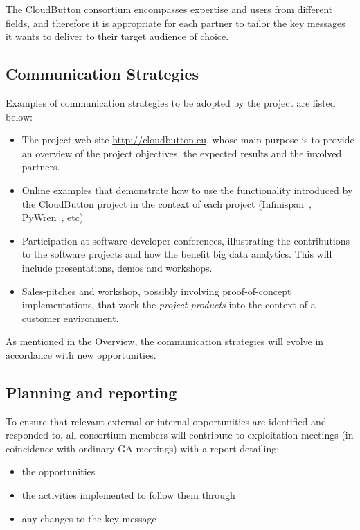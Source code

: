 \documentclass[a4paper,11pt]{article}
\begin{document}
The CloudButton consortium encompasses expertise and users from different fields, and therefore it is appropriate for each partner to tailor the key messages it wants to deliver to their target audience of choice.

\subsection{Communication Strategies}

Examples of communication strategies to be adopted by the project are listed below:

\begin{itemize}
\item The project web site \url{http://cloudbutton.eu}, whose main purpose is to provide an overview of the project objectives, the expected results and the involved partners.
\item Online examples that demonstrate how to use the functionality introduced by the CloudButton project in the context of each project (Infinispan~\cite{infinispan}, PyWren~\cite{PyWren2017}, etc)
\item Participation at software developer conferences, illustrating the contributions to the software projects and how the benefit big data analytics. This will include presentations, demos and workshops.
\item Sales-pitches and workshop, possibly involving proof-of-concept implementations, that work the \textit{project products} into the context of a customer environment.
\end{itemize}

As mentioned in the Overview, the communication strategies will evolve in accordance with new opportunities.

\subsection{Planning and reporting}

To ensure that relevant external or internal opportunities are identified and responded to, all consortium members will contribute to exploitation meetings (in coincidence with ordinary GA meetings) with a report detailing:

\begin{itemize}
\item the opportunities
\item the activities implemented to follow them through
\item any changes to the key message
\end{itemize}
\end{document}
